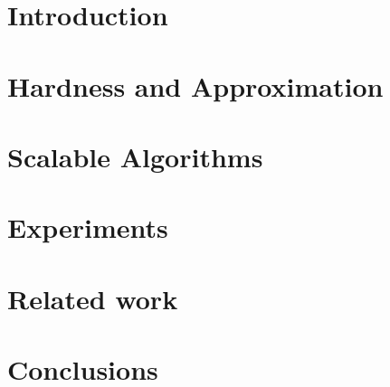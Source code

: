 \documentclass{vldb}
\begin{document}

\begin{abstract}

\end{abstract}

\thispagestyle{empty}

\section{Introduction}
\label{sec:intro}


\vspace{-4mm}



\section{Hardness and Approximation}
\label{sec:theory}


\section{Scalable Algorithms}
\label{sec:algorithms}


\section{Experiments}
\label{sec:experiments}


\section{Related work}
\label{sec:related}


\section{Conclusions}
\label{sec:conclusions}




%
%

%
\end{document}
